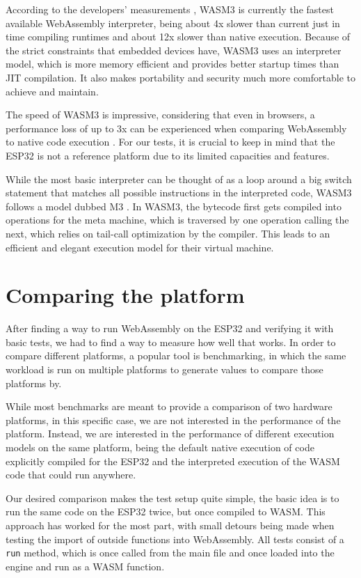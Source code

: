 According to the developers' measurements \autocite{shymanskyy_wasm3_2020}, WASM3 is currently the fastest available WebAssembly interpreter, being about 4x slower than current just in time compiling runtimes and about 12x slower than native execution. Because of the strict constraints that embedded devices have, WASM3 uses an interpreter model, which is more memory efficient and provides better startup times than JIT compilation. It also makes portability and security much more comfortable to achieve and maintain.

The speed of WASM3 is impressive, considering that even in browsers, a performance loss of up to 3x can be experienced when comparing WebAssembly to native code execution \autocite{jangda_not_2019}. For our tests, it is crucial to keep in mind that the ESP32 is not a reference platform due to its limited capacities and features.

While the most basic interpreter can be thought of as a loop around a big switch statement that matches all possible instructions in the interpreted code, WASM3 follows a model dubbed M3 \autocite{shymanskyy_wasm3interpreter_2020}. In WASM3, the bytecode first gets compiled into operations for the meta machine, which is traversed by one operation calling the next, which relies on tail-call optimization by the compiler. This leads to an efficient and elegant execution model for their virtual machine.

\section{Comparing the platform}
After finding a way to run WebAssembly on the ESP32 and verifying it with basic tests, we had to find a way to measure how well that works. In order to compare different platforms, a popular tool is benchmarking, in which the same workload is run on multiple platforms to generate values to compare those platforms by.

While most benchmarks are meant to provide a comparison of two hardware platforms, in this specific case, we are not interested in the performance of the platform. Instead, we are interested in the performance of different execution models on the same platform, being the default native execution of code explicitly compiled for the ESP32 and the interpreted execution of the WASM code that could run anywhere.

Our desired comparison makes the test setup quite simple, the basic idea is to run the same code on the ESP32 twice, but once compiled to WASM. This approach has worked for the most part, with small detours being made when testing the import of outside functions into WebAssembly. All tests consist of a \lstinline{run} method, which is once called from the main file and once loaded into the engine and run as a WASM function.

